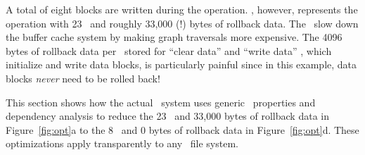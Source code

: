 A total of eight blocks are written during the operation.
%
\Kudos, however, represents the operation with 23 \patches\ and roughly 33,000
(!) bytes of rollback data.
%
The \patches\ slow down the buffer cache system by making graph traversals
more expensive.
%
The 4096 bytes of rollback data per \patch\ stored for ``clear data'' and
``write data'' \patches, which initialize and write data blocks, is
particularly painful since in this example, data blocks \emph{never}
need to be rolled back!


This section shows how the actual \Kudos\ system uses generic \patch\
properties and dependency analysis to reduce the 23 \patches\ and 33,000 bytes
of rollback data in Figure~\ref{fig:opt}a to the 8 \patches\ and 0 bytes of
rollback data in Figure~\ref{fig:opt}d.
%
These optimizations apply transparently to any \Kudos\ file system.


